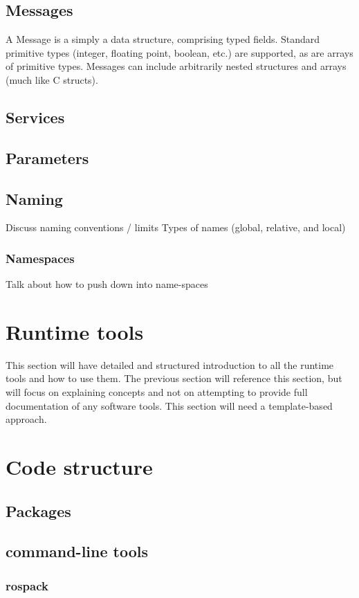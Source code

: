 \subsection{Messages}
A Message is a simply a data structure, comprising typed fields. Standard primitive types (integer, floating point, boolean, etc.) are supported, as are arrays of primitive types. Messages can include arbitrarily nested structures and arrays (much like C structs).

\subsection{Services}
\subsection{Parameters}
\subsection{Naming}
Discuss naming conventions / limits
Types of names (global, relative, and local)
\subsubsection{Namespaces}
Talk about how to push down into name-spaces
\section{Runtime tools}
This section will have detailed and structured introduction to all the runtime tools and how to use them.  The previous section will reference this section, but will focus on explaining concepts and not on attempting to provide full documentation of any software tools.  This section will need a template-based approach.

\section{Code structure}
\subsection{Packages}
\subsection{command-line tools}
\subsubsection{rospack}
